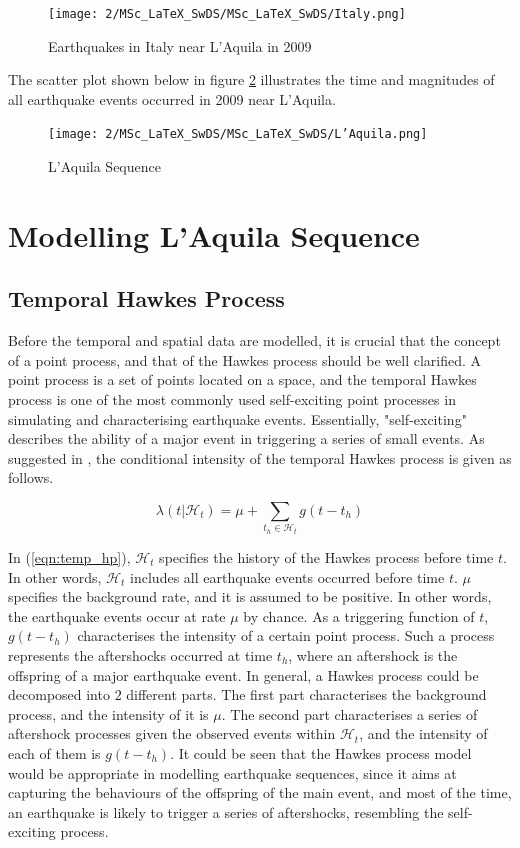 \documentclass[11pt,twoside]{article}
\numberwithin{Theorem}{section}
\numberwithin{Definition}{section}
\numberwithin{Lemma}{section}
\numberwithin{Algorithm}{section}
\numberwithin{equation}{section}
\begin{document}
\begin{figure}[H]
\centering
\texttt{[image: 2/MSc\_LaTeX\_SwDS/MSc\_LaTeX\_SwDS/Italy.png]}
\caption{Earthquakes in Italy near L'Aquila in 2009}
\label{fig:italy}
\end{figure}

The scatter plot shown below in figure \ref{fig:sequence} illustrates the time and magnitudes of all earthquake events occurred in 2009 near L'Aquila.

\begin{figure}[H]
\centering
\texttt{[image: 2/MSc\_LaTeX\_SwDS/MSc\_LaTeX\_SwDS/L'Aquila.png]}
\caption{L'Aquila Sequence}
\label{fig:sequence}
\end{figure}

\section{Modelling L'Aquila Sequence}
\label{sec:Models}
\subsection{Temporal Hawkes Process}
Before the temporal and spatial data are modelled, it is crucial that the concept of a point process, and that of the Hawkes process should be well clarified. A point process is a set of points located on a space, and the temporal Hawkes process is one of the most commonly used self-exciting point processes in simulating and characterising earthquake events. Essentially, "self-exciting" describes the ability of a major event in triggering a series of small events. As suggested in \cite{edinburghseismicityhubTemporalModeld}, the conditional intensity of the temporal Hawkes process is given as follows.

\begin{equation}\label{eqn:temp_hp}
\lambda(t|\mathcal{H}_t) = \mu  + \sum\limits_{{t_h} \in {\mathcal{H}_t}} {g(t - {t_h})} 
\end{equation}

In (\ref{eqn:temp_hp}), $\mathcal{H}_t$ specifies the history of the Hawkes process before time $t$. In other words, $\mathcal{H}_t$ includes all earthquake events occurred before time $t$. $\mu$ specifies the background rate, and it is assumed to be positive. In other words, the earthquake events occur at rate $\mu$ by chance. As a triggering function of $t$, $g(t-t_h)$ characterises the intensity of a certain point process. Such a process represents the aftershocks occurred at time $t_h$, where an aftershock is the offspring of a major earthquake event. In general, a Hawkes process could be decomposed into $2$ different parts. The first part characterises the background process, and the intensity of it is $\mu$. The second part characterises a series of aftershock processes given the observed events within $\mathcal{H}_t$, and the intensity of each of them is $g(t-t_h)$. It could be seen that the Hawkes process model would be appropriate in modelling earthquake sequences, since it aims at capturing the behaviours of the offspring of the main event, and most of the time, an earthquake is likely to trigger a series of aftershocks, resembling the self-exciting process.
\end{document}
